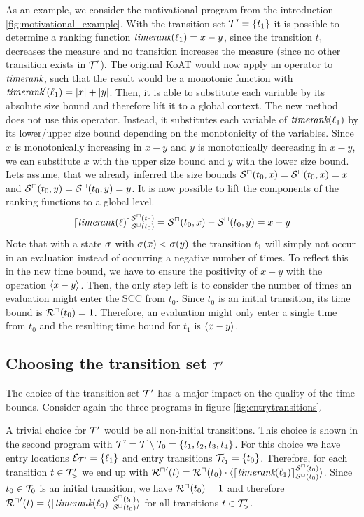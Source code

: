 

As an example, we consider the motivational program from the introduction \ref{fig:motivational_example}.
With the transition set $\mathcal{T}' = \lbrace t_1 \rbrace$ it is possible to determine a ranking function $\emph{timerank}(\ell_1) = x - y$, since the transition $t_1$ decreases the measure and no transition increases the measure (since no other transition exists in $\mathcal{T}'$).
The original KoAT would now apply an operator to $\emph{timerank}$, such that the result would be a monotonic function with $\emph{timerank}'(\ell_1) = \left|x\right| + \left|y\right|$.
Then, it is able to substitute each variable by its absolute size bound and therefore lift it to a global context.
The new method does not use this operator.
Instead, it substitutes each variable of $\emph{timerank}(\ell_1)$ by its lower/upper size bound depending on the monotonicity of the variables.
Since $x$ is monotonically increasing in $x-y$ and $y$ is monotonically decreasing in $x-y$, we can substitute $x$ with the upper size bound and $y$ with the lower size bound.
Lets assume, that we already inferred the size bounds ${\mathcal{S}^\sqcap}(t_0,x) = {\mathcal{S}^\sqcup}(t_0,x) = x$ and ${\mathcal{S}^\sqcap}(t_0,y) = {\mathcal{S}^\sqcup}(t_0,y) = y$.
It is now possible to lift the components of the ranking functions to a global level.
\[ \lceil \emph{timerank}(\ell) \rceil^{{\mathcal{S}^\sqcap}(t_0)}_{{\mathcal{S}^\sqcup}(t_0)} = {\mathcal{S}^\sqcap}(t_0, x) - {\mathcal{S}^\sqcup}(t_0, y) = x - y \]
Note that with a state $\sigma$ with $\sigma(x) < \sigma(y)$ the transition $t_1$ will simply not occur in an evaluation instead of occurring a negative number of times.
To reflect this in the new time bound, we have to ensure the positivity of $x - y$ with the operation $\langle x - y\rangle$.
Then, the only step left is to consider the number of times an evaluation might enter the SCC from $t_0$.
Since $t_0$ is an initial transition, its time bound is ${\mathcal{R}^\sqcap}(t_0) = 1$.
Therefore, an evaluation might only enter a single time from $t_0$ and the resulting time bound for $t_1$ is $\langle x - y\rangle$.

\subsection{Choosing the transition set $\mathcal{T}'$}

The choice of the transition set $\mathcal{T}'$ has a major impact on the quality of the time bounds.
Consider again the three programs in figure \ref{fig:entrytransitions}.

A trivial choice for $\mathcal{T}'$ would be all non-initial transitions.
This choice is shown in the second program with $\mathcal{T}' = \mathcal{T} \setminus \mathcal{T}_0 = \lbrace t_1, t_2, t_3, t_4 \rbrace$.
For this choice we have entry locations $\mathcal{E}_{\mathcal{T}'} = \lbrace \ell_1 \rbrace$ and entry transitions $\mathcal{T}_{\ell_1} = \lbrace t_0 \rbrace$.
Therefore, for each transition $t \in \mathcal{T}'_>$ we end up with ${\mathcal{R}^\sqcap}'(t) = {\mathcal{R}^\sqcap}(t_0) \cdot \langle\lceil \emph{timerank}(\ell_1) \rceil^{{\mathcal{S}^\sqcap}(t_0)}_{{\mathcal{S}^\sqcup}(t_0)}\rangle$.
Since $t_0 \in \mathcal{T}_0$ is an initial transition, we have ${\mathcal{R}^\sqcap}(t_0) = 1$ and therefore ${\mathcal{R}^\sqcap}'(t) = \langle\lceil \emph{timerank}(\ell_0) \rceil^{{\mathcal{S}^\sqcap}(t_0)}_{{\mathcal{S}^\sqcup}(t_0)}\rangle$ for all transitions $t \in \mathcal{T}'_>$.

